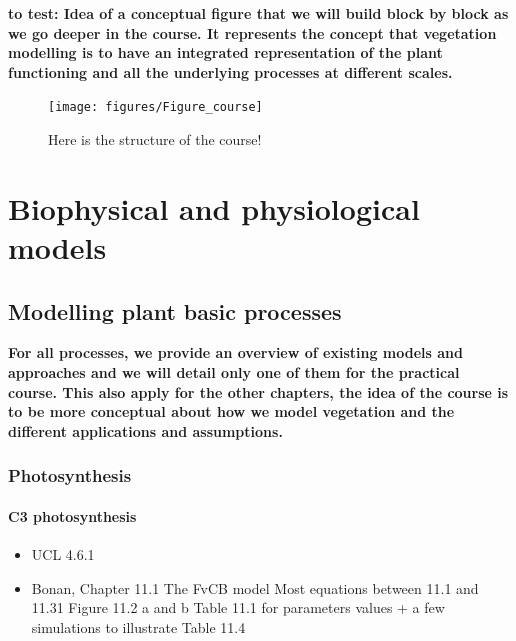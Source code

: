 \documentclass[oneside]{book}
\providecommand{\tightlist}{%
  \setlength{\itemsep}{0pt}\setlength{\parskip}{0pt}}
\begin{document}
\textbf{to test: Idea of a conceptual figure that we will build block by
block as we go deeper in the course. It represents the concept that
vegetation modelling is to have an integrated representation of the
plant functioning and all the underlying processes at different scales.
}

\begin{figure}

{\centering \texttt{[image: figures/Figure\_course]} 

}

\caption{Here is the structure of the course!}\label{fig:nice-fig2}
\end{figure}

\part{Biophysical and physiological
models}\label{part-biophysical-and-physiological-models}

\chapter{Modelling plant basic
processes}\label{modelling-plant-basic-processes}


\textbf{For all processes, we provide an overview of existing models and
approaches and we will detail only one of them for the practical course.
This also apply for the other chapters, the idea of the course is to be
more conceptual about how we model vegetation and the different
applications and assumptions.}

\section{Photosynthesis}\label{photosynthesis}

\subsection{C3 photosynthesis}\label{c3-photosynthesis}

\begin{itemize}
\tightlist
\item
  UCL 4.6.1
\item
  Bonan, Chapter 11.1 The FvCB model Most equations between 11.1 and
  11.31 Figure 11.2 a and b Table 11.1 for parameters values + a few
  simulations to illustrate Table 11.4
\end{itemize}
\end{document}
